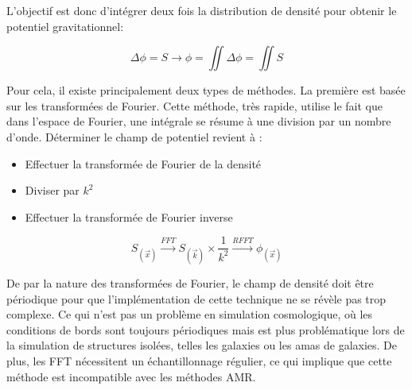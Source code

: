 L'objectif est donc d'intégrer deux fois la distribution de densité pour obtenir le potentiel gravitationnel:

\begin{equation}
\Delta \phi = S \longrightarrow \phi = \iint \Delta \phi = \iint S
\end{equation}

Pour cela, il existe principalement deux types de méthodes. 
La première est basée sur les transformées de Fourier. 
Cette méthode, très rapide, utilise le fait que dans l'espace de Fourier, une intégrale se résume à une division par un nombre d'onde. 
Déterminer le champ de potentiel revient à : 
\begin{itemize}
\item Effectuer la transformée de Fourier de la densité
\item Diviser par $k^2$
\item Effectuer la transformée de Fourier inverse
\end{itemize}

\begin{equation}
S_{(\vec{x})} \overset{FFT}{\longrightarrow}  S_{(\vec{k})} \times \frac{1}{k^2}  \overset{RFFT}{\longrightarrow}  \phi_{(\vec{x})}
\end{equation}

De par la nature des transformées de Fourier, le champ de densité doit être périodique pour que l'implémentation de cette technique ne se révèle pas trop complexe. 
Ce qui n'est pas un problème en simulation cosmologique, où les conditions de bords sont toujours périodiques mais est plus problématique lors de la simulation de structures isolées, telles les galaxies ou les amas de galaxies. 
De plus, les FFT nécessitent un échantillonnage régulier, ce qui implique que cette méthode est incompatible avec les méthodes \ac{AMR}. 

